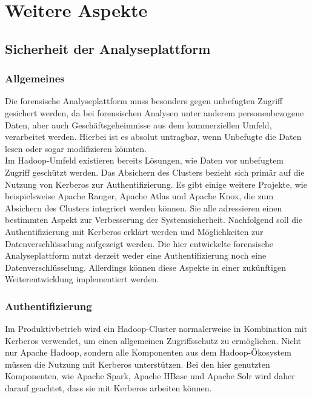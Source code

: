 \chapter{Weitere Aspekte}
\label{ch:additional_aspects}

\section{Sicherheit der Analyseplattform}
\label{sec:secure_platform}
\subsection{Allgemeines}
Die forensische Analyseplattform muss besonders gegen unbefugten Zugriff gesichert werden, da bei forensischen Analysen unter anderem personenbezogene Daten, aber auch Geschäftsgeheimnisse aus dem kommerziellen Umfeld, verarbeitet werden. Hierbei ist es absolut untragbar, wenn Unbefugte die Daten lesen oder sogar modifizieren könnten.\\

\noindent
Im Hadoop-Umfeld existieren bereits Lösungen, wie Daten vor unbefugtem Zugriff geschützt werden. Das Absichern des Clusters bezieht sich primär auf die Nutzung von Kerberos zur Authentifizierung. Es gibt einige weitere Projekte, wie beispielsweise Apache Ranger, Apache Atlas und Apache Knox, die zum Absichern des Clusters integriert werden können. Sie alle adressieren einen bestimmten Aspekt zur Verbesserung der Systemsicherheit. Nachfolgend soll die Authentifizierung mit Kerberos erklärt werden und Möglichkeiten zur Datenverschlüsselung aufgezeigt werden. Die hier entwickelte forensische Analyseplattform nutzt derzeit weder eine Authentifizierung noch eine Datenverschlüsselung. Allerdings können diese Aspekte in einer zukünftigen Weiterentwicklung implementiert werden.

\subsection{Authentifizierung}

Im Produktivbetrieb wird ein Hadoop-Cluster normalerweise in Kombination mit Kerberos verwendet, um einen allgemeinen Zugriffsschutz zu ermöglichen.\cite{hadoop_security} Nicht nur Apache Hadoop, sondern alle Komponenten aus dem Hadoop-Ökosystem müssen die Nutzung mit Kerberos unterstützen. Bei den hier genutzten Komponenten, wie Apache Spark, Apache HBase und Apache Solr wird daher darauf geachtet, dass sie mit Kerberos arbeiten können.\\

